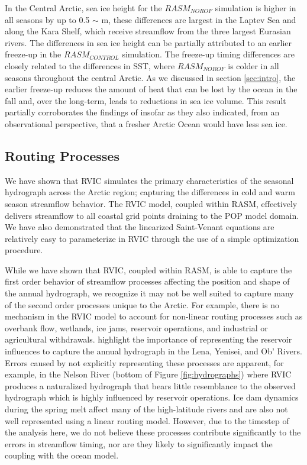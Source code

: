 \documentclass[jgrga, draft]{agutex}
\begin{document}
\begin{article}
In the Central Arctic, sea ice height for the $RASM_{NOROF}$ simulation is higher in all seasons by up to 0.5 $\sim$ m, these differences are largest in the Laptev Sea and along the Kara Shelf, which receive streamflow from the three largest Eurasian rivers.
The differences in sea ice height can be partially attributed to an earlier freeze-up in the $RASM_{CONTROL}$ simulation.
The freeze-up timing differences are closely related to the differences in SST, where $RASM_{NOROF}$ is colder in all seasons throughout the central Arctic.
As we discussed in section \ref{sec:intro}, the earlier freeze-up reduces the amount of heat that can be lost by the ocean in the fall and, over the long-term, leads to reductions in sea ice volume.
This result partially corroborates the findings of \citep{Morison_2012} insofar as they also indicated, from an observational perspective, that a fresher Arctic Ocean would have less sea ice. %

\subsection{Routing Processes}

We have shown that RVIC simulates the primary characteristics of the seasonal hydrograph across the Arctic region; capturing the differences in cold and warm season streamflow behavior.
The RVIC model, coupled within RASM, effectively delivers streamflow to all coastal grid points draining to the POP model domain.
We have also demonstrated that the linearized Saint-Venant equations are relatively easy to parameterize in RVIC through the use of a simple optimization procedure.

While we have shown that RVIC, coupled within RASM, is able to capture the first order behavior of streamflow processes affecting the position and shape of the annual hydrograph, we recognize it may not be well suited to capture many of the second order processes unique to the Arctic.
For example, there is no mechanism in the RVIC model to account for non-linear routing processes such as overbank flow, wetlands, ice jams, reservoir operations, and industrial or agricultural withdrawals.
\citet{Adam_2007} highlight the importance of representing the reservoir influences to capture the annual hydrograph in the Lena, Yenisei, and Ob' Rivers.
Errors caused by not explicitly representing these processes are apparent, for example, in the Nelson River (bottom of Figure \ref{fig:hydrographs}) where RVIC produces a naturalized hydrograph that bears little resemblance to the observed hydrograph which is highly influenced by reservoir operations.
Ice dam dynamics during the spring melt affect many of the high-latitude rivers and are also not well represented using a linear routing model.
However, due to the timestep of the analysis here, we do not believe these processes contribute significantly to the errors in streamflow timing, nor are they likely to significantly impact the coupling with the ocean model.


\end{article}
\end{document}
